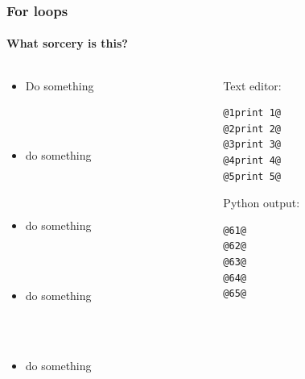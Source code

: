 \documentclass[handout]{beamer}
\begin{document}
\begin{frame}[fragile]
\frametitle{For loops}
\framesubtitle{What sorcery is this?}
\large
  \begin{columns}[T]
    \begin{column}{.5\textwidth} 


\begin{itemize}


\item<1-> {Do something}

\ \\

\ \\

\item<2-> {do something}

\ \\
\ \\


\item<3-> {do something}

\ \\
\ \\


\item<4-> {do something}

\ \\

\ \\

\item<5-> {do something}





\end{itemize}
     \end{column}
     
         \begin{column}{.5\textwidth} 
         Text editor:
\begin{lstlisting}[style=base]
@1print 1@
@2print 2@
@3print 3@
@4print 4@
@5print 5@

\end{lstlisting}

Python output:\begin{lstlisting}[style=base]
@61@
@62@
@63@
@64@
@65@


\end{lstlisting}

    \end{column}
    \end{columns}

\end{frame}
\end{document}
